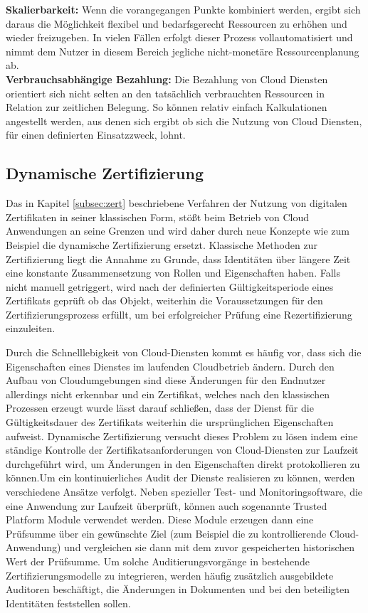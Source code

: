 \documentclass[
book,
a4paper,   
titlepage,  
halfparskip,
12pt        
]{scrartcl}
\begin{document}
\begin{onehalfspacing}
\textbf{Skalierbarkeit:} Wenn die vorangegangen Punkte kombiniert werden, ergibt sich daraus die Möglichkeit flexibel und bedarfsgerecht Ressourcen zu erhöhen und wieder freizugeben. In vielen Fällen erfolgt dieser Prozess vollautomatisiert und nimmt dem Nutzer in diesem Bereich jegliche nicht-monetäre Ressourcenplanung ab. \cite[S. 9]{cloudsec}\\
\textbf{Verbrauchsabhängige Bezahlung:} Die Bezahlung von Cloud Diensten orientiert sich nicht selten an den tatsächlich verbrauchten Ressourcen in Relation zur zeitlichen Belegung. So können relativ einfach Kalkulationen angestellt werden, aus denen sich ergibt ob sich die Nutzung von Cloud Diensten, für einen definierten Einsatzzweck, lohnt. \cite[S. 9]{cloudsec}\\

\subsection{Dynamische Zertifizierung} 
Das in Kapitel \vref{subsec:zert} beschriebene Verfahren der Nutzung von digitalen Zertifikaten in seiner klassischen Form, stößt beim Betrieb von Cloud Anwendungen an seine Grenzen und wird daher durch neue Konzepte wie zum Beispiel die dynamische Zertifizierung ersetzt. Klassische Methoden zur Zertifizierung liegt die Annahme zu Grunde, dass Identitäten über längere Zeit eine konstante Zusammensetzung von Rollen und Eigenschaften haben. Falls nicht manuell getriggert, wird nach der definierten Gültigkeitsperiode eines Zertifikats geprüft ob das Objekt, weiterhin die Voraussetzungen für den Zertifizierungsprozess erfüllt, um bei erfolgreicher Prüfung eine Rezertifizierung einzuleiten.\cite{cloudabs}

Durch die Schnelllebigkeit von Cloud-Diensten kommt es häufig vor, dass sich die Eigenschaften eines Dienstes im laufenden Cloudbetrieb ändern. Durch den Aufbau von Cloudumgebungen sind diese Änderungen für den Endnutzer allerdings nicht erkennbar und ein Zertifikat, welches nach den klassischen Prozessen erzeugt wurde lässt darauf schließen, dass der Dienst für die Gültigkeitsdauer des Zertifikats weiterhin die ursprünglichen Eigenschaften aufweist. Dynamische Zertifizierung versucht dieses Problem zu lösen indem eine ständige Kontrolle der Zertifikatsanforderungen von Cloud-Diensten zur Laufzeit durchgeführt wird, um Änderungen in den Eigenschaften direkt protokollieren zu können.\newline Um ein kontinuierliches Audit der Dienste realisieren zu können, werden verschiedene Ansätze verfolgt. Neben spezieller Test- und Monitoringsoftware, die eine Anwendung zur Laufzeit überprüft, können auch sogenannte Trusted Platform Module verwendet werden. Diese Module erzeugen dann eine Prüfsumme über ein gewünschte Ziel (zum Beispiel die zu kontrollierende Cloud-Anwendung) und vergleichen sie dann mit dem zuvor gespeicherten historischen Wert der Prüfsumme. Um solche Auditierungsvorgänge in bestehende Zertifizierungsmodelle zu integrieren, werden häufig zusätzlich ausgebildete Auditoren beschäftigt, die Änderungen in Dokumenten und bei den beteiligten Identitäten feststellen sollen.\cite[S. 114ff]{cloudsec}


\end{onehalfspacing}
\end{document}
